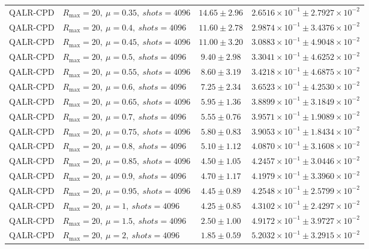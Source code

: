 \begin{table}[t]
\begin{tabular}{@{}llcc@{}}
QALR-CPD & \(R_{\max}=20,\ \mu=0.35,\ shots=4096\) & \(14.65 \pm 2.96\) & \(2.6516{\times}10^{-1} \pm 2.7927{\times}10^{-2}\) \\
QALR-CPD & \(R_{\max}=20,\ \mu=0.4,\ shots=4096\) & \(11.60 \pm 2.78\) & \(2.9874{\times}10^{-1} \pm 3.4376{\times}10^{-2}\) \\
QALR-CPD & \(R_{\max}=20,\ \mu=0.45,\ shots=4096\) & \(11.00 \pm 3.20\) & \(3.0883{\times}10^{-1} \pm 4.9048{\times}10^{-2}\) \\
QALR-CPD & \(R_{\max}=20,\ \mu=0.5,\ shots=4096\) & \(9.40 \pm 2.98\) & \(3.3041{\times}10^{-1} \pm 4.6252{\times}10^{-2}\) \\
QALR-CPD & \(R_{\max}=20,\ \mu=0.55,\ shots=4096\) & \(8.60 \pm 3.19\) & \(3.4218{\times}10^{-1} \pm 4.6875{\times}10^{-2}\) \\
QALR-CPD & \(R_{\max}=20,\ \mu=0.6,\ shots=4096\) & \(7.25 \pm 2.34\) & \(3.6523{\times}10^{-1} \pm 4.2530{\times}10^{-2}\) \\
QALR-CPD & \(R_{\max}=20,\ \mu=0.65,\ shots=4096\) & \(5.95 \pm 1.36\) & \(3.8899{\times}10^{-1} \pm 3.1849{\times}10^{-2}\) \\
QALR-CPD & \(R_{\max}=20,\ \mu=0.7,\ shots=4096\) & \(5.55 \pm 0.76\) & \(3.9571{\times}10^{-1} \pm 1.9089{\times}10^{-2}\) \\
QALR-CPD & \(R_{\max}=20,\ \mu=0.75,\ shots=4096\) & \(5.80 \pm 0.83\) & \(3.9053{\times}10^{-1} \pm 1.8434{\times}10^{-2}\) \\
QALR-CPD & \(R_{\max}=20,\ \mu=0.8,\ shots=4096\) & \(5.10 \pm 1.12\) & \(4.0870{\times}10^{-1} \pm 3.1608{\times}10^{-2}\) \\
QALR-CPD & \(R_{\max}=20,\ \mu=0.85,\ shots=4096\) & \(4.50 \pm 1.05\) & \(4.2457{\times}10^{-1} \pm 3.0446{\times}10^{-2}\) \\
QALR-CPD & \(R_{\max}=20,\ \mu=0.9,\ shots=4096\) & \(4.70 \pm 1.17\) & \(4.1979{\times}10^{-1} \pm 3.3960{\times}10^{-2}\) \\
QALR-CPD & \(R_{\max}=20,\ \mu=0.95,\ shots=4096\) & \(4.45 \pm 0.89\) & \(4.2548{\times}10^{-1} \pm 2.5799{\times}10^{-2}\) \\
QALR-CPD & \(R_{\max}=20,\ \mu=1,\ shots=4096\) & \(4.25 \pm 0.85\) & \(4.3102{\times}10^{-1} \pm 2.4297{\times}10^{-2}\) \\
QALR-CPD & \(R_{\max}=20,\ \mu=1.5,\ shots=4096\) & \(2.50 \pm 1.00\) & \(4.9172{\times}10^{-1} \pm 3.9727{\times}10^{-2}\) \\
QALR-CPD & \(R_{\max}=20,\ \mu=2,\ shots=4096\) & \(1.85 \pm 0.59\) & \(5.2032{\times}10^{-1} \pm 3.2915{\times}10^{-2}\) \\
\bottomrule
\end{tabular}
\end{table}